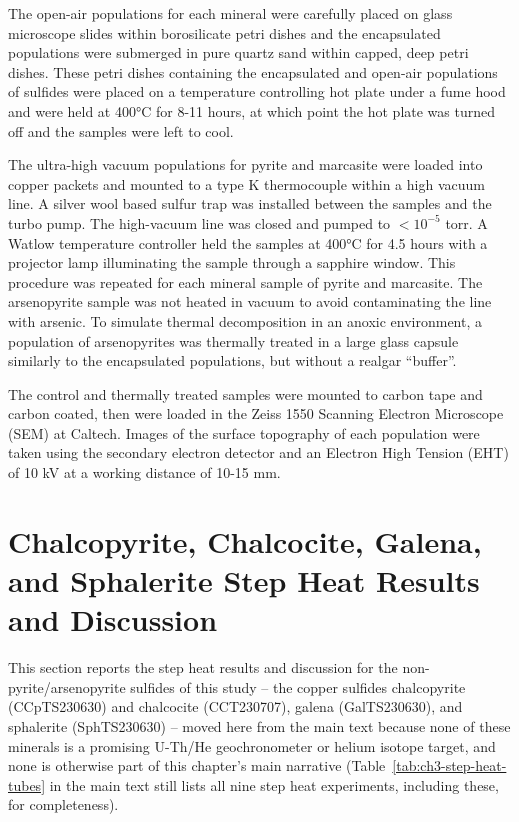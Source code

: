 The open-air populations for each mineral were carefully placed on glass microscope slides within borosilicate petri dishes and the encapsulated populations were submerged in pure quartz sand within capped, deep petri dishes. These petri dishes containing the encapsulated and open-air populations of sulfides were placed on a temperature controlling hot plate under a fume hood and were held at 400°C for 8-11 hours, at which point the hot plate was turned off and the samples were left to cool. 

The ultra-high vacuum populations for pyrite and marcasite were loaded into copper packets and mounted to a type K thermocouple within a high vacuum line. A silver wool based sulfur trap was installed between the samples and the turbo pump. The high-vacuum line was closed and pumped to $<10^{-5}$ torr. A Watlow temperature controller held the samples at 400°C for 4.5 hours with a projector lamp illuminating the sample through a sapphire window. This procedure was repeated for each mineral sample of pyrite and marcasite. The arsenopyrite sample was not heated in vacuum to avoid contaminating the line with arsenic. To simulate thermal decomposition in an anoxic environment, a population of arsenopyrites was thermally treated in a large glass capsule similarly to the encapsulated populations, but without a realgar “buffer”.

The control and thermally treated samples were mounted to carbon tape and carbon coated, then were loaded in the Zeiss 1550 Scanning Electron Microscope (SEM) at Caltech. Images of the surface topography of each population were taken using the secondary electron detector and an Electron High Tension (EHT) of 10 kV at a working distance of 10-15 mm. 

\section{Chalcopyrite, Chalcocite, Galena, and Sphalerite Step Heat Results and Discussion}
\label{ch3-si-cu-pb-sulfides}

This section reports the step heat results and discussion for the
non-pyrite/arsenopyrite sulfides of this study -- the copper sulfides
chalcopyrite (CCpTS230630) and chalcocite (CCT230707), galena
(GalTS230630), and sphalerite (SphTS230630) -- moved here from the main text because none of these minerals is
a promising U-Th/He geochronometer or helium isotope target, and none
is otherwise part of this chapter's main narrative (Table~\ref{tab:ch3-step-heat-tubes} in the main
text still lists all nine step heat experiments, including these,
for completeness).

